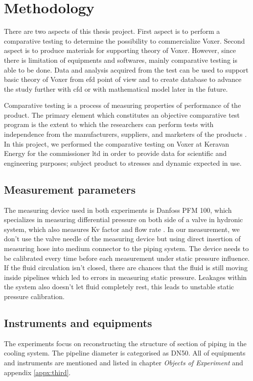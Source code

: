 
\chapter{Methodology}

There are two aspects of this thesis project. First aspect is to perform a comparative testing to determine the possibility to commercialize Voxer. Second aspect is to produce materials for supporting theory of Voxer. However, since there is limitation of equipments and softwares, mainly comparative testing is able to be done. Data and analysis acquired from the test can be used to support basic theory of Voxer from \gls{efd} point of view \cite{springer:book}and to create database to advance the study further with \gls{cfd} or with mathematical model later in the future.

Comparative testing is a process of measuring properties of performance of the product. The primary element which constitutes an objective comparative test program is the extent to which the researchers can perform tests with independence from the manufacturers, suppliers, and marketers of the products \cite{test:book}. In this project, we performed the comparative testing on Voxer at Keravan Energy for the commissioner \gls{ltd} in order to provide data for scientific and engineering purposes; subject product to stresses and dynamic expected in use. 

\section{Measurement parameters}

The measuring device used in both experiments is Danfoss PFM 100, which specializes in measuring differential pressure on both side of a valve in hydronic system, which also measures Kv factor and flow rate \cite{danfoss:web}. In our measurement, we don't use the valve needle of the measuring device but using direct insertion of measuring hose into medium connector to the piping system. The device needs to be calibrated every time before each measurement under static pressure influence. If the fluid circulation isn't closed, there are chances that the fluid is still moving inside pipelines which led to errors in measuring static pressure. Leakages within the system also doesn't let fluid completely rest, this leads to unstable static pressure calibration.
  
\section{Instruments and equipments}
The experiments focus on reconstructing the structure of section of piping in the cooling system. The pipeline diameter is categorised as DN50. 
All of equipments and instruments are mentioned and listed in chapter \textit{Objects of Experiment} and appendix \ref{appx:third}.

